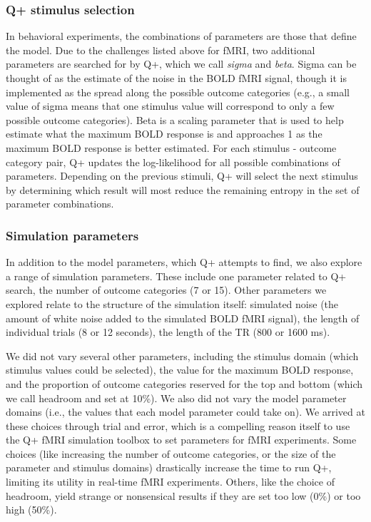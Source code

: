 \documentclass[
  man,floatsintext]{apa6}
\begin{document}
\hypertarget{q-stimulus-selection}{%
\subsubsection{Q+ stimulus selection}\label{q-stimulus-selection}}

In behavioral experiments, the combinations of parameters are those that define the model. Due to the challenges listed above for fMRI, two additional parameters are searched for by Q+, which we call \emph{sigma} and \emph{beta}. Sigma can be thought of as the estimate of the noise in the BOLD fMRI signal, though it is implemented as the spread along the possible outcome categories (e.g., a small value of sigma means that one stimulus value will correspond to only a few possible outcome categories). Beta is a scaling parameter that is used to help estimate what the maximum BOLD response is and approaches 1 as the maximum BOLD response is better estimated.
For each stimulus - outcome category pair, Q+ updates the log-likelihood for all possible combinations of parameters. Depending on the previous stimuli, Q+ will select the next stimulus by determining which result will most reduce the remaining entropy in the set of parameter combinations.

\hypertarget{simulation-parameters}{%
\subsubsection{Simulation parameters}\label{simulation-parameters}}

In addition to the model parameters, which Q+ attempts to find, we also explore a range of simulation parameters. These include one parameter related to Q+ search, the number of outcome categories (7 or 15). Other parameters we explored relate to the structure of the simulation itself: simulated noise (the amount of white noise added to the simulated BOLD fMRI signal), the length of individual trials (8 or 12 seconds), the length of the TR (800 or 1600 ms).

We did not vary several other parameters, including the stimulus domain (which stimulus values could be selected), the value for the maximum BOLD response, and the proportion of outcome categories reserved for the top and bottom (which we call headroom and set at 10\%). We also did not vary the model parameter domains (i.e., the values that each model parameter could take on). We arrived at these choices through trial and error, which is a compelling reason itself to use the Q+ fMRI simulation toolbox to set parameters for fMRI experiments. Some choices (like increasing the number of outcome categories, or the size of the parameter and stimulus domains) drastically increase the time to run Q+, limiting its utility in real-time fMRI experiments. Others, like the choice of headroom, yield strange or nonsensical results if they are set too low (0\%) or too high (50\%).
\end{document}
